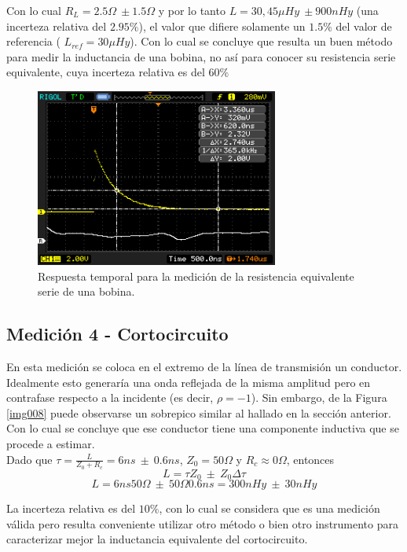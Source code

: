 \documentclass[a4paper,10pt]{article}
\begin{document}
	\indent Con lo cual $R_L=2.5\Omega~\pm 1.5\Omega$ y por lo tanto $L=30,45\mu Hy~\pm 900nHy$ (una incerteza relativa del $2.95\%$), el 
	valor que difiere solamente un $1.5\% $ del valor de referencia (
	$L_{ref}=30\mu Hy$). Con lo cual se concluye que resulta un buen m\'etodo para medir la inductancia de una bobina, no as\'i para conocer su resistencia serie equivalente, cuya incerteza relativa es del $60 \%$
	
		\begin{figure}[!htb]
			\centering
			\includegraphics[width=8cm]
			{Imagenes/InductorR.png}
			\caption{Respuesta temporal para la medici\'on de la resistencia 
			equivalente serie de una bobina.}
			\label{img007}
		\end{figure}			
	
	
	\subsection{Medición 4 - Cortocircuito}
	\indent En esta medici\'on se coloca en el extremo de la l\'inea de 
	transmisi\'on un conductor. Idealmente esto generar\'ia una onda reflejada
	de la misma amplitud pero en contrafase respecto a la incidente (es decir,
	$\rho=-1$). Sin embargo, de la Figura \ref{img008} puede observarse un 
	sobrepico similar al hallado en la secci\'on anterior. Con lo cual se 
	concluye que ese conductor tiene una componente inductiva que se procede a
	estimar. \\
	\indent Dado que $\tau=\frac{L}{Z_0+R_c}=6ns~\pm~0.6ns$,  $Z_0=50\Omega$ y 
	$R_c\approx 0\Omega$, entonces
	$$L=\tau Z_0~\pm~Z_0\Delta\tau$$
	$$L=6ns 50\Omega~\pm~50\Omega0.6ns=300nHy~\pm~30nHy$$
	
La incerteza relativa es del $10 \%$, con lo cual se considera que es una medici\'on v\'alida pero resulta conveniente utilizar otro m\'etodo o bien otro instrumento para caracterizar mejor la inductancia equivalente del cortocircuito.
\end{document}
